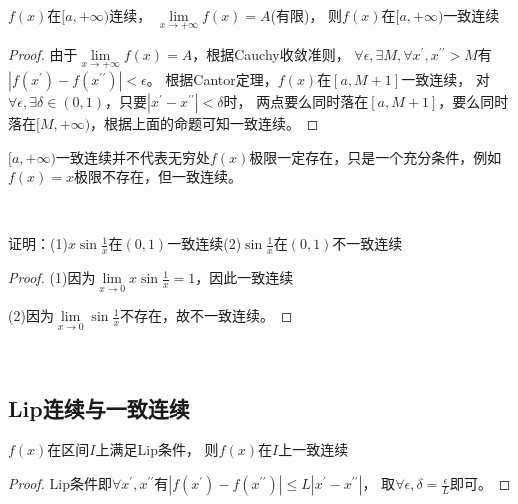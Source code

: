 ~

\begin{theorem}[无穷区间一致连续]
  $f(x)$在$[a,+\infty)$连续，
  $\lim \limits _{x \rightarrow +\infty}f(x) = A$(有限)，
  则$f(x)$在$[a,+\infty)$一致连续
\end{theorem}

\begin{proof}
  由于$\lim \limits _{x \rightarrow +\infty}f(x) = A$，根据Cauchy收敛准则，
  $\forall \epsilon, \exists M, \forall x^{\prime},x^{\prime\prime} > M$有$|f(x^{\prime}) - f(x^{\prime\prime})| < \epsilon$。
  根据Cantor定理，$f(x)$在$[a,M+1]$一致连续，
  对$\forall \epsilon, \exists \delta \in (0,1)$，只要$|x^{\prime} - x^{\prime\prime}| < \delta$时，
  两点要么同时落在$[a,M+1]$，要么同时落在$[M,+\infty)$，根据上面的命题可知一致连续。
\end{proof}

\begin{note}
  $[a,+\infty)$一致连续并不代表无穷处$f(x)$极限一定存在，只是一个充分条件，例如$f(x) = x$极限不存在，但一致连续。
\end{note}

~

\begin{exercise}[开区间一致连续]
  证明：(1)$x\sin \frac{1}{x}$在$(0,1)$一致连续(2)$\sin \frac{1}{x}$在$(0,1)$不一致连续
\end{exercise}

\begin{proof}
  (1)因为$\lim \limits _{x \rightarrow 0}x \sin \frac{1}{x} = 1$，因此一致连续

  (2)因为$\lim \limits _{x \rightarrow 0}\sin \frac{1}{x}$不存在，故不一致连续。
\end{proof}

~


\subsection{Lip连续与一致连续}

\begin{theorem}[Lip连续与一致连续]
  $f(x)$在区间$I$上满足Lip条件，
  则$f(x)$在$I$上一致连续
\end{theorem}

\begin{proof}
  Lip条件即$\forall x^{\prime},x^{\prime\prime}$有$|f(x^{\prime}) - f(x^{\prime\prime})| \leq L |x^{\prime}  - x^{\prime\prime}|$，
  取$\forall \epsilon, \delta = \frac{\epsilon}{L}$即可。
\end{proof}


